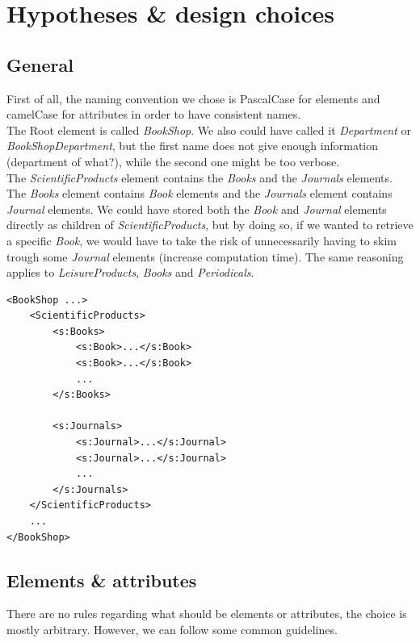 \section{Hypotheses \& design choices}

\subsection{General}

First of all, the naming convention we chose is PascalCase for elements and
camelCase for attributes in order to have consistent names.\\

The Root element is called \emph{BookShop}. We also could have called it
\emph{Department} or \emph{BookShopDepartment}, but the first name does not give
enough information (department of what?), while the second one might be too
verbose.\\

The \emph{ScientificProducts} element contains the \emph{Books} and the
\emph{Journals} elements. The \emph{Books} element contains \emph{Book} elements
and the \emph{Journals} element contains \emph{Journal} elements.
We could have stored both the \emph{Book} and \emph{Journal} elements directly
as children of \emph{ScientificProducts}, but by doing so, if we wanted to
retrieve a specific \emph{Book}, we would have to take the risk of unnecessarily
having to skim trough some \emph{Journal} elements (increase computation time).
The same reasoning applies to \emph{LeisureProducts}, \emph{Books} and
\emph{Periodicals}.
\begin{lstlisting}
<BookShop ...>
    <ScientificProducts>
        <s:Books>
            <s:Book>...</s:Book>
            <s:Book>...</s:Book>
            ...
        </s:Books>
        
        <s:Journals>
            <s:Journal>...</s:Journal>
            <s:Journal>...</s:Journal>
            ...
        </s:Journals>
    </ScientificProducts>
    ...
</BookShop>
\end{lstlisting}

\subsection{Elements \& attributes \small{
    \cite{cite:ibmGuidelines} \cite{cite:soAttrElem}
    \cite{cite:ukGovTalkGuidelines}
}}

There are no rules regarding what should be elements or attributes, the choice
is mostly arbitrary. However, we can follow some common guidelines.\\

